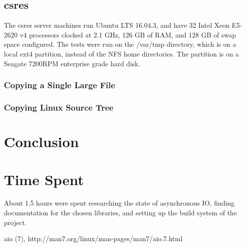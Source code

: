 \documentclass[11pt]{article}
\begin{document}
\subsection{csres}
The csres server machines run Ubuntu LTS 16.04.3, and have 32 Intel Xeon E5-2620 v4 processors clocked at 2.1 GHz, 126 GB of RAM, and 128 GB of swap space configured. The tests were run on the /var/tmp directory, which is on a local ext4 partition, instead of the NFS home directories. The partition is on a Seagate 7200RPM enterprise grade hard disk.

\subsubsection{Copying a Single Large File}
\subsubsection{Copying Linux Source Tree}


\section{Conclusion}

\section{Time Spent}

About 1.5 hours were spent researching the state of asynchronous IO, finding
documentation for the chosen libraries, and setting up the build system of the
project.

\begin{thebibliography}{99}
        aio (7), http://man7.org/linux/man-pages/man7/aio.7.html
\end{thebibliography}
\end{document}

